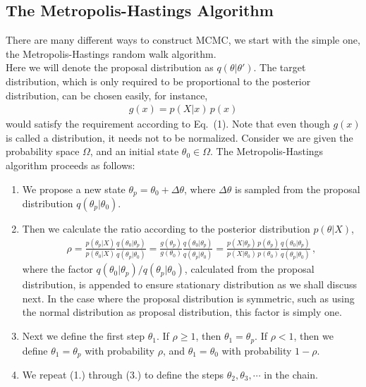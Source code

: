 \documentclass[11pt]{article}
\theoremstyle{break}
\theoremstyle{break}
\begin{document}
\subsection{The Metropolis-Hastings Algorithm}
${}$\qquad There are many different ways to construct MCMC, we start with the simple one, the Metropolis-Hastings random walk algorithm.\\

${}$\qquad Here we will denote the proposal distribution as $q(\theta | \theta')$. The target distribution, which is only required to be proportional to the posterior distribution, can be chosen easily, for instance,
\begin{align*}
g(x) = p(X|x) \, p(x)
\end{align*}
would satisfy the requirement according to Eq.\ (1). Note that even though $g(x)$ is called a distribution, it needs not to be normalized. Consider we are given the probability space $\Omega$, and an initial state $\theta_0 \in \Omega$. The Metropolis-Hastings algorithm proceeds as follows:
\begin{enumerate}[topsep=3pt,itemsep=-1ex,partopsep=1ex,parsep=1ex]
\item We propose a new state $\theta_p = \theta_0 + \Delta \theta$, where $\Delta \theta$ is sampled from the proposal distribution $q(\theta_p|\theta_0)$.
\item Then we calculate the ratio according to the posterior distribution $p(\theta|X)$,
\begin{align}
\rho = \frac{p(\theta_p|X)}{p(\theta_0|X)} \frac{q(\theta_0|\theta_p)}{q(\theta_p|\theta_0)}= \frac{g(\theta_p)}{g(\theta_0)}\frac{q(\theta_0|\theta_p)}{q(\theta_p|\theta_0)}    =
\frac{p(X|\theta_p)\, p(\theta_p)}{p(X|\theta_0)\, p(\theta_0)}
\frac{q(\theta_0|\theta_p)}{q(\theta_p|\theta_0)}  \,,
\end{align}
where the factor $q(\theta_0|\theta_p )/q(\theta_p|\theta_0)$, calculated from the proposal distribution, is appended to ensure stationary distribution as we shall discuss next. In the case where the proposal distribution is symmetric, such as using the normal distribution as proposal distribution, this factor is simply one. 
\item Next we define the first step $\theta_1$. If $\rho \geq 1$, then $\theta_1 = \theta_p$. If $\rho < 1$, then we define $\theta_1 = \theta_p$ with probability $\rho$, and $\theta_1 = \theta_0$ with probability $1-\rho$.
\item We repeat (1.) through (3.) to define the steps $\theta_2, \theta_3,\cdots$ in the chain. 
\end{enumerate}
\end{document}
